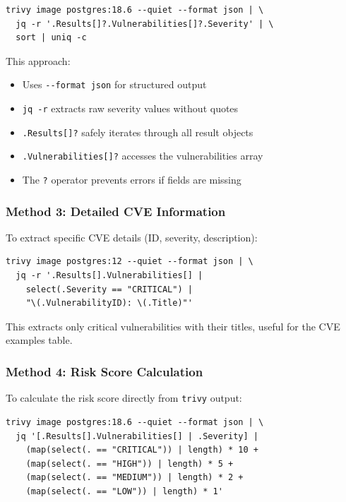 \documentclass[11pt, a4paper]{article}
\begin{document}
\begin{verbatim}
trivy image postgres:18.6 --quiet --format json | \
  jq -r '.Results[]?.Vulnerabilities[]?.Severity' | \
  sort | uniq -c
\end{verbatim}

\noindent This approach:
\begin{itemize}
    \item Uses \texttt{-{}-format json} for structured output
    \item \texttt{jq -r} extracts raw severity values without quotes
    \item \texttt{.Results[]?} safely iterates through all result objects
    \item \texttt{.Vulnerabilities[]?} accesses the vulnerabilities array
    \item The \texttt{?} operator prevents errors if fields are missing
\end{itemize}

\subsubsection{Method 3: Detailed CVE Information}

To extract specific CVE details (ID, severity, description):

\begin{verbatim}
trivy image postgres:12 --quiet --format json | \
  jq -r '.Results[].Vulnerabilities[] | 
    select(.Severity == "CRITICAL") | 
    "\(.VulnerabilityID): \(.Title)"'
\end{verbatim}

\noindent This extracts only critical vulnerabilities with their titles, useful for the CVE examples table.

\subsubsection{Method 4: Risk Score Calculation}

To calculate the risk score directly from \texttt{trivy} output:

\begin{verbatim}
trivy image postgres:18.6 --quiet --format json | \
  jq '[.Results[].Vulnerabilities[] | .Severity] |
    (map(select(. == "CRITICAL")) | length) * 10 + 
    (map(select(. == "HIGH")) | length) * 5 + 
    (map(select(. == "MEDIUM")) | length) * 2 + 
    (map(select(. == "LOW")) | length) * 1'
\end{verbatim}
\end{document}
